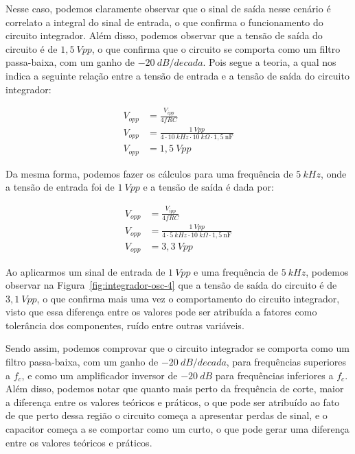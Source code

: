 
Nesse caso, podemos claramente observar que o sinal de saída nesse cenário é correlato a integral do sinal de entrada, o que confirma o funcionamento do circuito integrador. Além disso, podemos observar que a tensão de saída do circuito é de $1,5~Vpp$, o que confirma que o circuito se comporta como um filtro passa-baixa, com um ganho de $-20~dB/decada$. Pois segue a teoria, a qual nos indica a seguinte relação entre a tensão de entrada e a tensão de saída do circuito integrador:

\begin{align}
    V_{opp} &= \frac{V_{ipp}}{4fRC} \\
    V_{opp} &= \frac{1~Vpp}{4 \cdot 10~kHz \cdot 10~k\Omega \cdot 1,5~\si{\nano\farad}} \\
    V_{opp} &= 1,5~Vpp
\end{align}

Da mesma forma, podemos fazer os cálculos para uma frequência de $5~kHz$, onde a tensão de entrada foi de $1~Vpp$ e a tensão de saída é dada por:

\begin{align}
    V_{opp} &= \frac{V_{ipp}}{4fRC} \\
    V_{opp} &= \frac{1~Vpp}{4 \cdot 5~kHz \cdot 10~k\Omega \cdot 1,5~\si{\nano\farad}} \\
    V_{opp} &= 3,3~Vpp
\end{align}

Ao aplicarmos um sinal de entrada de $1~Vpp$ e uma frequência de $5~kHz$, podemos observar na Figura~\ref{fig:integrador-osc-4} que a tensão de saída do circuito é de $3,1~Vpp$, o que confirma mais uma vez o comportamento do circuito integrador, visto que essa diferença entre os valores pode ser atribuída a fatores como tolerância dos componentes, ruído entre outras variáveis.


Sendo assim, podemos comprovar que o circuito integrador se comporta como um filtro passa-baixa, com um ganho de $-20~dB/decada$, para frequências superiores a $f_c$, e como um amplificador inversor de $-20~dB$ para frequências inferiores a $f_c$. Além disso, podemos notar que quanto mais perto da frequência de corte, maior a diferença entre os valores teóricos e práticos, o que pode ser atribuído ao fato de que perto dessa região o circuito começa a apresentar perdas de sinal, e o capacitor começa a se comportar como um curto, o que pode gerar uma diferença entre os valores teóricos e práticos.

